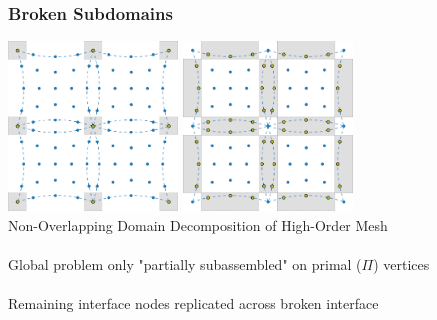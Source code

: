 \documentclass{beamer}
\begin{document}
\begin{frame}
\begin{center}
\frametitle{Broken Subdomains}

\includegraphics[height=4.5cm]{../img/HighOrderBDDCMeshPrimal}
\hspace{10mm}
\includegraphics[height=4.5cm]{../img/HighOrderBDDCMeshInterfaceBroken}\\
{\small Non-Overlapping Domain Decomposition of High-Order Mesh}\\

~\\

Global problem only "partially subassembled" on primal ($\Pi$) vertices\\

~\\

Remaining interface nodes replicated across broken interface

\end{center}
\end{frame}

\end{document}
